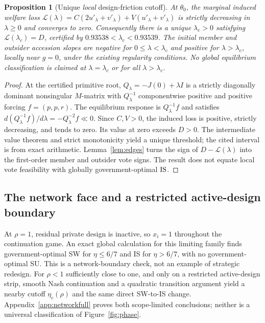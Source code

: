 \documentclass[11pt,a4paper]{article}
\newtheorem{proposition}[theorem]{Proposition}
\theoremstyle{remark}\newtheorem{remark}[theorem]{Remark}
\newcommand{\loss}{\mathcal L}\newcommand{\vect}[1]{\boldsymbol{#1}}
\begin{document}
\begin{proposition}[Unique \emph{local} design-friction cutoff]\label{prop:lambda}
At $\theta_0$, the marginal induced welfare loss $\loss(\lambda)=C(2u'_\lambda+v'_\lambda)+V(u'_\lambda+v'_\lambda)$ is strictly decreasing in $\lambda\ge0$ and converges to zero. Consequently there is a unique $\lambda_c>0$ satisfying $\loss(\lambda_c)=D$, certified by $0.93538<\lambda_c<0.93539$. The initial member and outsider accession slopes are negative for $0\le\lambda<\lambda_c$ and positive for $\lambda>\lambda_c$, locally near $g=0$, under the existing regularity conditions. No global equilibrium classification is claimed at $\lambda=\lambda_c$ or for all $\lambda>\lambda_c$.
\end{proposition}
\begin{proof}
At the certified primitive root, $Q_\lambda=-J(0)+\lambda I$ is a strictly diagonally dominant nonsingular $M$-matrix with $Q_\lambda^{-1}$ componentwise positive and positive forcing $f=(p,p,r)$. The equilibrium response is $Q_\lambda^{-1}f$ and satisfies $d(Q_\lambda^{-1}f)/d\lambda=-Q_\lambda^{-2}f\ll0$. Since $C,V>0$, the induced loss is positive, strictly decreasing, and tends to zero. Its value at zero exceeds $D>0$. The intermediate value theorem and strict monotonicity yield a unique threshold; the cited interval is from exact arithmetic. Lemma~\ref{lem:edges} turns the sign of $D-\loss(\lambda)$ into the first-order member and outsider vote signs. The result does not equate local vote feasibility with globally government-optimal $\mathrm{IS}$.
\end{proof}

\subsection{The network face and a restricted active-design boundary}
At $\rho=1$, residual private design is inactive, so $x_i=1$ throughout the continuation game. An exact global calculation for this limiting family finds government-optimal SW for $\eta\le6/7$ and IS for $\eta>6/7$, with no government-optimal SU. This is a network-boundary check, not an example of strategic redesign. For $\rho<1$ sufficiently close to one, and only on a restricted active-design strip, smooth Nash continuation and a quadratic transition argument yield a nearby cutoff $\eta_c(\rho)$ and the same direct SW-to-IS change. Appendix~\ref{app:networkfull} proves both scope-limited conclusions; neither is a universal classification of Figure~\ref{fig:phase}.
\end{document}
